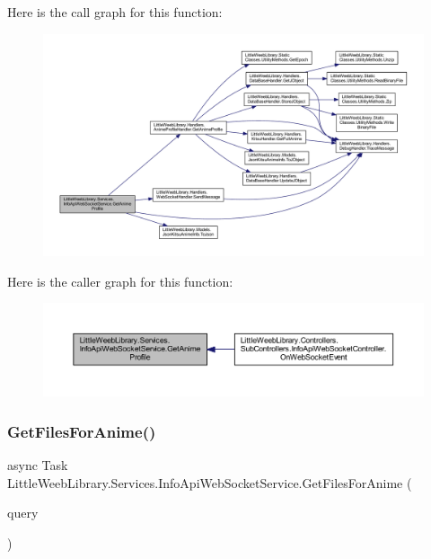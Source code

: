 Here is the call graph for this function\+:\nopagebreak
\begin{figure}[H]
\begin{center}
\leavevmode
\includegraphics[width=350pt]{class_little_weeb_library_1_1_services_1_1_info_api_web_socket_service_a12f4d83332b28988ce0e2bc5ff3ed369_cgraph}
\end{center}
\end{figure}
Here is the caller graph for this function\+:\nopagebreak
\begin{figure}[H]
\begin{center}
\leavevmode
\includegraphics[width=350pt]{class_little_weeb_library_1_1_services_1_1_info_api_web_socket_service_a12f4d83332b28988ce0e2bc5ff3ed369_icgraph}
\end{center}
\end{figure}
\mbox{\label{class_little_weeb_library_1_1_services_1_1_info_api_web_socket_service_a299be5b400f1368ab169599395a3e56d}} 
\subsubsection{\texorpdfstring{Get\+Files\+For\+Anime()}{GetFilesForAnime()}}
{\footnotesize\ttfamily async Task Little\+Weeb\+Library.\+Services.\+Info\+Api\+Web\+Socket\+Service.\+Get\+Files\+For\+Anime (\begin{DoxyParamCaption}\item[{J\+Object}]{query }\end{DoxyParamCaption})}




